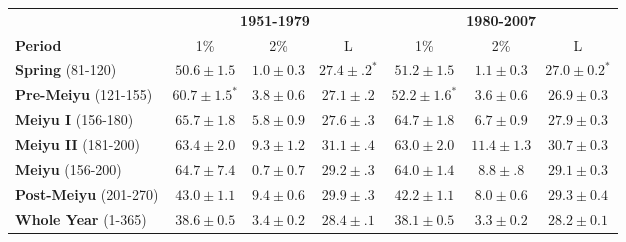 \documentclass[draft,grl]{AGUTeX}
\begin{document}
\begin{table}
\begin{tabular}{ l c c c c c c}
	& \multicolumn{3}{c}{\textbf{1951-1979}} & \multicolumn{3}{c}{\textbf{1980-2007}} \\
	\textbf{Period} & 1\% & 2\% & L & 1\% & 2\% & L \\
	\hline	
	\textbf{Spring} (81-120) & $50.6 \pm 1.5$ & $1.0 \pm 0.3$ & $\boldsymbol{27.4 \pm .2^*}$ & $51.2 \pm 1.5$ & $1.1 \pm 0.3$ & $\boldsymbol{27.0 \pm 0.2^*}$ \\
	\textbf{Pre-Meiyu} (121-155) & $\boldsymbol{60.7 \pm 1.5^*}$ & $3.8 \pm 0.6$ & $27.1 \pm .2$ & $\boldsymbol{52.2 \pm 1.6^*}$ & $3.6 \pm 0.6$ & $26.9 \pm 0.3$ \\
	\textbf{Meiyu I} (156-180) &	$65.7 \pm 1.8$ & $5.8 \pm 0.9$ & $27.6 \pm .3$ & $64.7 \pm 1.8$  & $6.7 \pm 0.9$ & $ 27.9 \pm 0.3$ \\
	\textbf{Meiyu II} (181-200) & $63.4 \pm 2.0$ & $9.3 \pm 1.2$ & $31.1 \pm .4$ & $63.0 \pm 2.0$ & $11.4 \pm 1.3$ & $30.7 \pm 0.3$ \\
	\textbf{Meiyu} (156-200) & $64.7 \pm 7.4$ & $0.7 \pm 0.7$ & $29.2 \pm .3$ & $64.0 \pm 1.4$ & $8.8 \pm .8$ & $29.1 \pm 0.3$ \\
	\textbf{Post-Meiyu} (201-270) & $43.0 \pm 1.1 $ & $9.4 \pm 0.6$ & $\boldsymbol{29.9 \pm .3}$ & $42.2 \pm 1.1$ & $8.0 \pm 0.6$ & $\boldsymbol{29.3 \pm 0.4}$  \\
	\textbf{Whole Year} (1-365) & $38.6 \pm 0.5 $ & $3.4 \pm 0.2 $ & $\boldsymbol{28.4 \pm .1}$ & $38.1 \pm 0.5$ & $3.3 \pm 0.2$ & $\boldsymbol{28.2 \pm 0.1} $ \\
\end{tabular}


\end{table}
\end{document}
